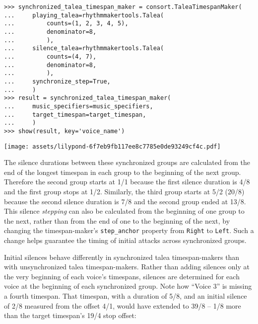 \begin{abjadbookoutput}
\begin{singlespacing}
\vspace{-0.5\baselineskip}
\begin{verbatim}
>>> synchronized_talea_timespan_maker = consort.TaleaTimespanMaker(
...     playing_talea=rhythmmakertools.Talea(
...         counts=(1, 2, 3, 4, 5),
...         denominator=8,
...         ),
...     silence_talea=rhythmmakertools.Talea(
...         counts=(4, 7),
...         denominator=8,
...         ),
...     synchronize_step=True,
...     )
>>> result = synchronized_talea_timespan_maker(
...     music_specifiers=music_specifiers,
...     target_timespan=target_timespan,
...     )
>>> show(result, key='voice_name')
\end{verbatim}
\noindent\texttt{[image: assets/lilypond-6f7eb9fb117ee8c7785e0de93249cf4c.pdf]}
\end{singlespacing}
\end{abjadbookoutput}

\noindent The silence durations between these synchronized groups are
calculated from the end of the longest timespan in each group to the beginning
of the next group. Therefore the second group starts at 1/1 because the first
silence duration is 4/8 and the first group stops at 1/2. Similarly, the third
group starts at 5/2 (20/8) because the second silence duration is 7/8 and the
second group ended at 13/8. This silence \emph{stepping} can also be calculated
from the beginning of one group to the next, rather than from the end of one to
the beginning of the next, by changing the timespan-maker's
\texttt{step\_anchor} property from \texttt{Right} to \texttt{Left}. Such a
change helps guarantee the timing of initial attacks across synchronized
groups.

Initial silences behave differently in synchronized talea timespan-makers than
with unsynchronized talea timespan-makers. Rather than adding silences only at
the very beginning of each voice's timespans, silences are determined for each
voice at the beginning of each synchronized group. Note how \enquote{Voice 3}
is missing a fourth timespan. That timespan, with a duration of 5/8, and an
initial silence of 2/8 measured from the offset 4/1, would have extended to
39/8 -- 1/8 more than the target timespan's 19/4 stop offset:

\begin{comment}
<abjad>
synchronized_talea_timespan_maker = new(
    synchronized_talea_timespan_maker,
    initial_silence_talea=rhythmmakertools.Talea(
        counts=(0, 1, 2),
        denominator=8,
        ),
    )
result = synchronized_talea_timespan_maker(
    music_specifiers=music_specifiers,
    target_timespan=target_timespan,
    )
show(result, key='voice_name')
</abjad>
\end{comment}

